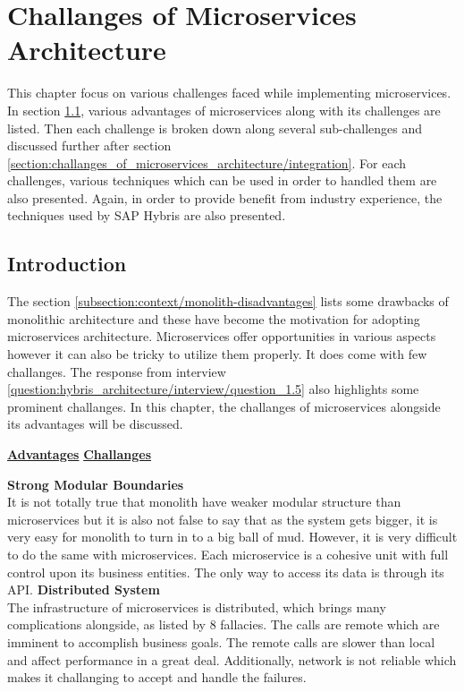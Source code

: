 \chapter{Challanges of Microservices Architecture}\label{chapter:challanges_of_microservices_architecture}
This chapter focus on various challenges faced while implementing microservices. In section \ref{section:challanges_of_microservices_architecture/introduction}, various advantages of microservices along with its challenges are listed. Then each challenge is broken down along several sub-challenges and discussed further after section \ref{section:challanges_of_microservices_architecture/integration}. For each challenges, various techniques which can be used in order to handled them are also presented. Again, in order to provide benefit from industry experience, the techniques used by SAP Hybris are also presented.
\section{Introduction}\label{section:challanges_of_microservices_architecture/introduction}
The section \ref{subsection:context/monolith-disadvantages} lists some drawbacks of monolithic architecture and these have become the motivation for adopting microservices architecture. Microservices offer opportunities in various aspects however it can also be tricky to utilize them properly. It does come with few challanges. The response from interview \ref{question:hybris_architecture/interview/question_1.5} also highlights some prominent challanges. In this chapter, the challanges of microservices alongside its advantages will be discussed. \cite{Fowler:2015aa}

\label{section:challanges_of_microservices_architecture/introduction/challenges}
  \begin{multicols}{2}
  \textbf{\underline{Advantages}} 
  \vfill
  \columnbreak
  \textbf{\underline{Challanges}}
  \end{multicols}
  \begin{multicols}{2}
  \textbf{Strong Modular Boundaries} \\It is not totally true that monolith have weaker modular structure than microservices but it is also not false to say that as the system gets bigger, it is very easy for monolith to turn in to a big ball of mud. However, it is very difficult to do the same with microservices. Each microservice is a cohesive unit with full control upon its business entities. The only way to access its data is through its \acrshort{API}.
  \vfill
  \columnbreak
  \textbf{Distributed System} \\The infrastructure of microservices is distributed, which brings many complications alongside, as listed by 8 fallacies.\cite{Factor:2014aa} The calls are remote which are imminent to accomplish business goals. The remote calls are slower than local and affect performance in a great deal. Additionally, network is not reliable which makes it challanging to accept and handle the failures.
  \end{multicols}

